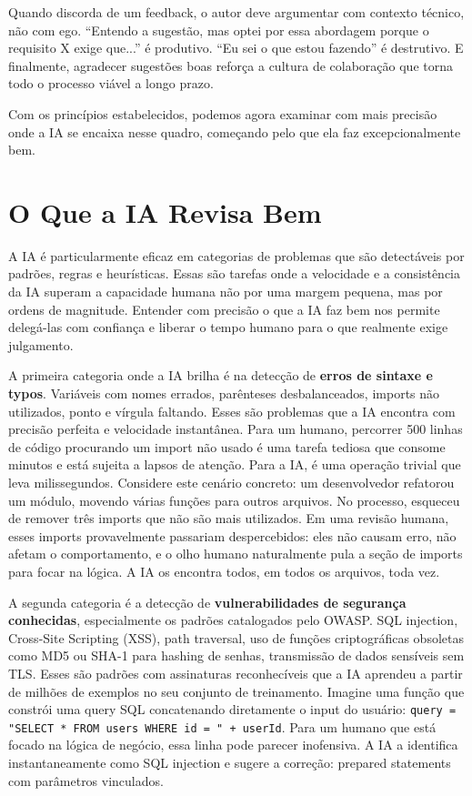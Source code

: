 Quando discorda de um feedback, o autor deve argumentar com contexto técnico, não com
ego. ``Entendo a sugestão, mas optei por essa abordagem porque o requisito X exige
que...'' é produtivo. ``Eu sei o que estou fazendo'' é destrutivo. E finalmente,
agradecer sugestões boas reforça a cultura de colaboração que torna todo o processo
viável a longo prazo.

Com os princípios estabelecidos, podemos agora examinar com mais precisão onde a IA
se encaixa nesse quadro, começando pelo que ela faz excepcionalmente bem.

\section{O Que a IA Revisa Bem}

A IA é particularmente eficaz em categorias de problemas que são detectáveis
por padrões, regras e heurísticas. Essas são tarefas onde a velocidade e
a consistência da IA superam a capacidade humana não por uma margem pequena,
mas por ordens de magnitude. Entender com precisão o que a IA faz bem nos
permite delegá-las com confiança e liberar o tempo humano para o que realmente
exige julgamento.

A primeira categoria onde a IA brilha é na detecção de \textbf{erros de sintaxe e
typos}. Variáveis com nomes errados, parênteses desbalanceados, imports não
utilizados, ponto e vírgula faltando. Esses são problemas que a IA encontra com
precisão perfeita e velocidade instantânea. Para um humano, percorrer 500 linhas de
código procurando um import não usado é uma tarefa tediosa que consome minutos e está
sujeita a lapsos de atenção. Para a IA, é uma operação trivial que leva
milissegundos. Considere este cenário concreto: um desenvolvedor refatorou um módulo,
movendo várias funções para outros arquivos. No processo, esqueceu de remover três
imports que não são mais utilizados. Em uma revisão humana, esses imports provavelmente
passariam despercebidos: eles não causam erro, não afetam o comportamento, e o olho
humano naturalmente pula a seção de imports para focar na lógica. A IA os encontra
todos, em todos os arquivos, toda vez.

A segunda categoria é a detecção de \textbf{vulnerabilidades de segurança conhecidas},
especialmente os padrões catalogados pelo OWASP. SQL injection, Cross-Site Scripting
(XSS), path traversal, uso de funções criptográficas obsoletas como MD5 ou SHA-1 para
hashing de senhas, transmissão de dados sensíveis sem TLS. Esses são padrões com
assinaturas reconhecíveis que a IA aprendeu a partir de milhões de exemplos no seu
conjunto de treinamento. Imagine uma função que constrói uma query SQL concatenando
diretamente o input do usuário: \texttt{query = "SELECT * FROM users WHERE id = " +
userId}. Para um humano que está focado na lógica de negócio, essa linha pode
parecer inofensiva. A IA a identifica instantaneamente como SQL injection e sugere a
correção: prepared statements com parâmetros vinculados.

